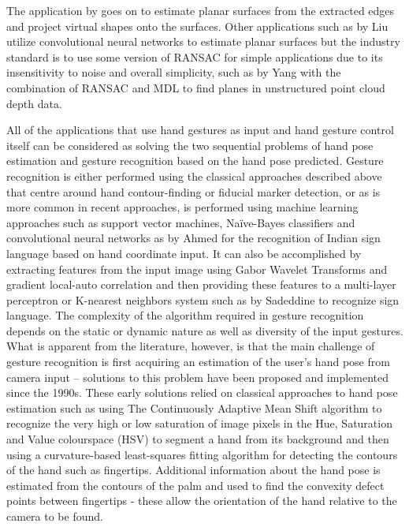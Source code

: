 The application by \cite{snaptoreality} goes on to estimate planar surfaces from the extracted edges and project virtual shapes onto the surfaces. Other applications such as by Liu \cite{liu2019planercnn} utilize convolutional neural networks to estimate planar surfaces but the industry standard is to use some version of RANSAC for simple applications due to its insensitivity to noise and overall simplicity, such as by Yang \cite{yang2010plane} with the combination of RANSAC and MDL to find planes in unstructured point cloud depth data.

All of the applications that use hand gestures as input and hand gesture control itself can be considered as solving the two sequential problems of hand pose estimation and gesture recognition based on the hand pose predicted. Gesture recognition is either performed using the classical approaches described above that centre around hand contour-finding or fiducial marker detection, or as is more common in recent approaches, is performed using machine learning approaches such as support vector machines, Naïve-Bayes classifiers and convolutional neural networks as by Ahmed \cite{indian_sign_language} for the recognition of Indian sign language based on hand coordinate input. It can also be accomplished by extracting features from the input image using Gabor Wavelet Transforms and gradient local-auto correlation and then providing these features to a multi-layer perceptron or K-nearest neighbors system such as by Sadeddine \cite{combined_sign_language} to recognize sign language. The complexity of the algorithm required in gesture recognition depends on the static or dynamic nature as well as diversity of the input gestures. \\

What is apparent from the literature, however, is that the main challenge of gesture recognition is first acquiring an estimation of the user’s hand pose from camera input – solutions to this problem have been proposed and implemented since the 1990s. These early solutions \cite{hand_classical_approach} relied on classical approaches to hand pose estimation such as using The Continuously Adaptive Mean Shift algorithm to recognize the very high or low saturation of image pixels in the Hue, Saturation and Value colourspace (HSV) to segment a hand from its background and then using a curvature-based least-squares fitting algorithm for detecting the contours of the hand such as fingertips. Additional information about the hand pose is estimated from the contours of the palm and used to find the convexity defect points between fingertips - these allow the orientation of the hand relative to the camera to be found. \\

